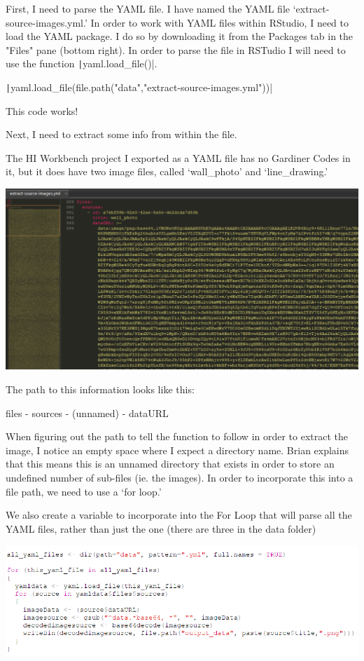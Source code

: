 \documentclass{article}
\begin{document}
First, I need to parse the YAML file. I have named the YAML file `extract-source-images.yml.' In order to work with YAML files within RStudio, I need to load the YAML package. I do so by downloading it from the Packages tab in the "Files" pane (bottom right). In order to parse the file in RSTudio I will need to use the function \texttt|yaml.load_file()|.

\texttt|yaml.load_file(file.path("data","extract-source-images.yml"))|

This code works!

Next, I need to extract some info from within the file.

The HI Workbench project I exported as a YAML file has no Gardiner Codes in it, but it does have two image files, called `wall\_photo' and `line\_drawing.'

\includegraphics[width=1.0\textwidth]{sublime_1.PNG}

The path to this information looks like this:

files - sources - (unnamed) - dataURL

{\item When figuring out the path to tell the function to follow in order to extract the image, I notice an empty space where I expect a directory name. Brian explains that this means this is an unnamed directory that exists in order to store an undefined number of sub-files (ie. the images). In order to incorporate this into a file path, we need to use a `for loop.'}

We also create a variable to incorporate into the For Loop that will parse all the YAML files, rather than just the one (there are three in the data folder)

\includegraphics[width=1.0\textwidth]{rstudio_50.PNG}
\end{document}
